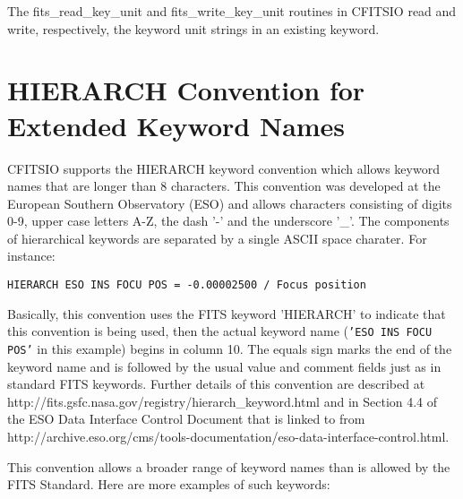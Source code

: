 \documentclass[11pt]{book}
\begin{document}
The fits\_read\_key\_unit and fits\_write\_key\_unit routines in
CFITSIO read and write, respectively, the keyword unit strings in an
existing keyword.


\section{HIERARCH Convention for Extended Keyword Names}

CFITSIO supports the HIERARCH keyword convention which allows keyword
names that are longer than 8 characters.  This convention
was developed at the European Southern Observatory (ESO) and allows characters
consisting of digits 0-9, upper case letters A-Z, the dash '-' and the underscore '\_'.
The components of hierarchical keywords are separated by a single ASCII space charater.
For instance:

\begin{verbatim}
HIERARCH ESO INS FOCU POS = -0.00002500 / Focus position
\end{verbatim}
Basically, this convention uses the FITS keyword 'HIERARCH' to indicate
that this convention is being used, then the actual keyword name
({\tt'ESO INS FOCU POS'} in this example) begins in column 10.  The
equals sign marks the end of the keyword name and is followed by the
usual value and comment fields just as in standard FITS keywords.
Further details of this convention are described at
http://fits.gsfc.nasa.gov/registry/hierarch\_keyword.html
and in Section 4.4 of the ESO Data Interface Control Document that
is linked to from
http://archive.eso.org/cms/tools-documentation/eso-data-interface-control.html.

This convention allows a broader range of keyword names
than is allowed by the FITS Standard.  Here are more examples
of such keywords:
\end{document}
